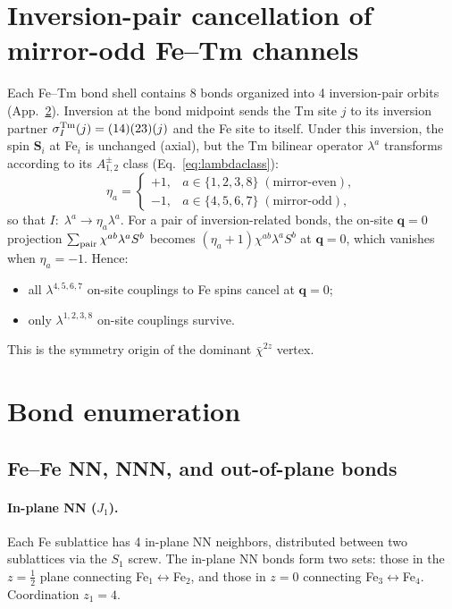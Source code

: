 \documentclass[reprint,amsmath,amssymb,aps,prb,longbibliography]{revtex4-2}
\newcommand{\bfS}{\mathbf{S}}
\newcommand{\half}{\tfrac{1}{2}}
\begin{document}
\section{Inversion-pair cancellation of mirror-odd Fe--Tm channels}
\label{sec:bondsymmetry}
\label{app:bondcancel}

Each Fe--Tm bond shell contains 8 bonds organized into 4 inversion-pair
orbits (App.~\ref{app:bonds}). Inversion at the bond midpoint sends the
Tm site $j$ to its inversion partner $\sigma^{\rm Tm}_I(j)=(14)(23)(j)$
and the Fe site to itself. Under this inversion, the spin $\bfS_i$ at
Fe$_i$ is unchanged (axial), but the Tm bilinear operator $\lambda^a$
transforms according to its $A_{1,2}^{\pm}$ class (Eq.~\eqref{eq:lambdaclass}):
\begin{equation}
\eta_a = \begin{cases} +1, & a\in\{1,2,3,8\}\;(\text{mirror-even}),\\
-1, & a\in\{4,5,6,7\}\;(\text{mirror-odd}),
\end{cases}
\label{eq:Iaction}
\end{equation}
so that $I:\;\lambda^a\to\eta_a\lambda^a$.
For a pair of inversion-related bonds, the on-site $\mathbf q=0$
projection $\sum_{\rm pair}\chi^{ab}\lambda^a S^b$ becomes
$(\eta_a + 1)\chi^{ab}\lambda^a S^b$ at $\mathbf q=0$, which vanishes
when $\eta_a=-1$. Hence:
\begin{itemize}[leftmargin=*]
\item all $\lambda^{4,5,6,7}$ on-site couplings to Fe spins cancel at
$\mathbf q=0$;
\item only $\lambda^{1,2,3,8}$ on-site couplings survive.
\end{itemize}
This is the symmetry origin of the dominant $\bar\chi^{2z}$ vertex.

\section{Bond enumeration}
\label{app:bonds}

\subsection{Fe--Fe NN, NNN, and out-of-plane bonds}

\paragraph{In-plane NN ($J_1$).} Each Fe sublattice has 4 in-plane NN
neighbors, distributed between two sublattices via the $S_1$ screw. The
in-plane NN bonds form two sets: those in the $z=\half$ plane connecting
Fe$_1\leftrightarrow$Fe$_2$, and those in $z=0$ connecting Fe$_3
\leftrightarrow$Fe$_4$. Coordination $z_1 = 4$.
\end{document}
